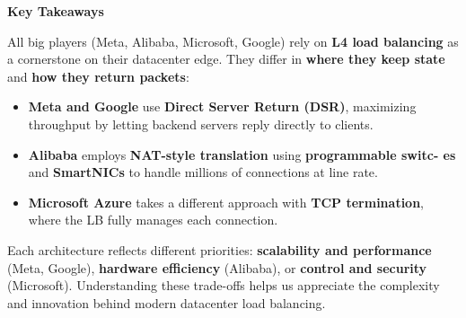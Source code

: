 \highspace
\begin{flushleft}
    \textcolor{Green3}{ \textbf{Key Takeaways}}
\end{flushleft}
All big players (Meta, Alibaba, Microsoft, Google) rely on \textbf{L4 load balancing} as a cornerstone on their datacenter edge. They differ in \textbf{where they keep state} and \textbf{how they return packets}:
\begin{itemize}
    \item \textbf{Meta and Google} use \textbf{Direct Server Return (DSR)}, maximizing throughput by letting backend servers reply directly to clients.
    \item \textbf{Alibaba} employs \textbf{NAT-style translation} using \textbf{programmable switc-\- es} and \textbf{SmartNICs} to handle millions of connections at line rate.
    \item \textbf{Microsoft Azure} takes a different approach with \textbf{TCP termination}, where the LB fully manages each connection.
\end{itemize}
Each architecture reflects different priorities: \textbf{scalability and performance} (Meta, Google), \textbf{hardware efficiency} (Alibaba), or \textbf{control and security} (Microsoft). Understanding these trade-offs helps us appreciate the complexity and innovation behind modern datacenter load balancing.